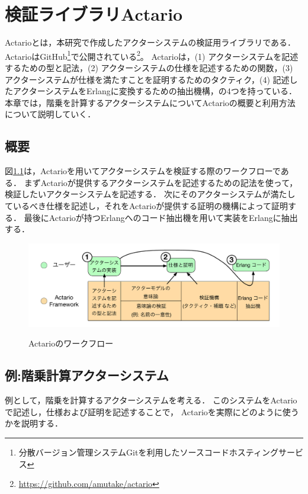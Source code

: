 \chapter{検証ライブラリActario}
\label{chapter:overview}

Actario\cite{Yasutake:2015aa}とは，本研究で作成したアクターシステムの検証用ライブラリである．
ActarioはGitHub\footnote{分散バージョン管理システムGitを利用したソースコードホスティングサービス}で公開されている\footnote{\url{https://github.com/amutake/actario}}。
Actarioは，(1) アクターシステムを記述するための型と記法，(2) アクターシステムの仕様を記述するための関数，(3) アクターシステムが仕様を満たすことを証明するためのタクティク，(4) 記述したアクターシステムをErlangに変換するための抽出機構，の4つを持っている．
本章では，階乗を計算するアクターシステムについてActarioの概要と利用方法について説明していく．

\section{概要}

図\ref{img:overview:workflow}は，Actarioを用いてアクターシステムを検証する際のワークフローである．
まずActarioが提供するアクターシステムを記述するための記法を使って，検証したいアクターシステムを記述する．
次にそのアクターシステムが満たしているべき仕様を記述し，それをActarioが提供する証明の機構によって証明する．
最後にActarioが持つErlangへのコード抽出機を用いて実装をErlangに抽出する．

\begin{figure}[tp]
  \centering
  \includegraphics[width=15cm]{./img/overview/workflow.pdf}
  \label{img:overview:workflow}
  \caption{Actarioのワークフロー}
\end{figure}

\section{例:階乗計算アクターシステム}

例として，階乗を計算するアクターシステムを考える．
このシステムをActarioで記述し，仕様および証明を記述することで，
Actarioを実際にどのように使うかを説明する．

